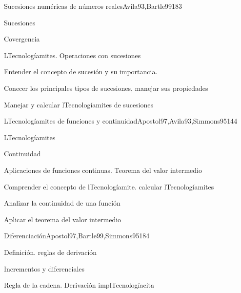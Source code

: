 \begin{syllabus}
\begin{unit}{Sucesiones numéricas de números reales}{Avila93,Bartle99}{18}{3}
   \begin{topics}
      \item Sucesiones
      \item Covergencia
      \item LTecnologíamites. Operaciones con sucesiones
   \end{topics}

   \begin{unitgoals}
      \item Entender el concepto de sucesión y su importancia.
      \item Conecer los principales tipos de sucesiones, manejar sus propiedades
      \item Manejar y calcular lTecnologíamites de sucesiones
      \end{unitgoals}
\end{unit}

\begin{unit}{LTecnologíamites de funciones y continuidad}{Apostol97,Avila93,Simmons95}{14}{4}
   \begin{topics}
      \item LTecnologíamites
      \item Continuidad
      \item Aplicaciones de funciones continuas. Teorema del valor intermedio
   \end{topics}

   \begin{unitgoals}
      \item Comprender el concepto de lTecnologíamite. calcular lTecnologíamites
      \item Analizar la continuidad de una función
      \item Aplicar el teorema del valor intermedio
      \end{unitgoals}
\end{unit}

\begin{unit}{Diferenciación}{Apostol97,Bartle99,Simmons95}{18}{4}
   \begin{topics}
      \item Definición. reglas de derivación
      \item Incrementos y diferenciales
      \item Regla de la cadena. Derivación implTecnologíacita
   \end{topics}


\end{unit}
\end{syllabus}
